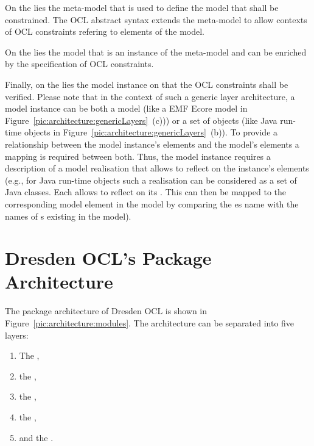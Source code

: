 On the  lies 
the meta-model that is used to define the model that shall be constrained. The
\acs{OCL} abstract syntax extends the meta-model to allow contexts of \acs{OCL}
constraints refering to elements of the model.

On the  lies the model that is an instance of the meta-model
and can be enriched by the specification of \acs{OCL} constraints. 

Finally, on the  lies the model instance on that the 
\acs{OCL} constraints shall be verified. Please note that in the context of 
such a generic layer architecture, a model instance can be both a model (like a
\acs{EMF} Ecore model in Figure~\ref{pic:architecture:genericLayers}~(c))) or a
set of objects (like Java run-time objects in
Figure~\ref{pic:architecture:genericLayers}~(b)). To provide a relationship
between the model instance's elements and the model's elements a mapping is
required between both. Thus, the model instance requires a description of a
model realisation that allows to reflect on the instance's elements (e.g., for
Java run-time objects such a realisation can be considered as a set of Java
classes. Each  allows to reflect on its
. This  can then be mapped to the
corresponding model element in the model by comparing the es name
with the names of s existing in the model).



\section{Dresden OCL's Package Architecture}

The package architecture of Dresden OCL is shown in
Figure~\ref{pic:architecture:modules}. The architecture can be separated into
five layers: 

\begin{enumerate}
  \item The ,
  \item the ,
  \item the ,
  \item the ,
  \item and the .
\end{enumerate}

